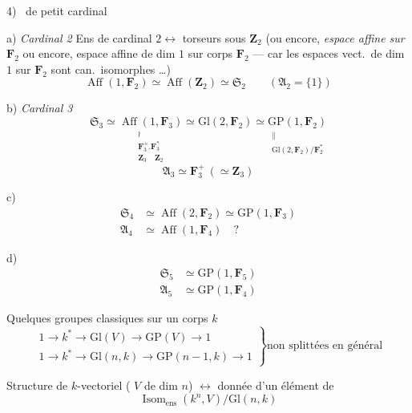 \documentclass[11pt,a4paper]{article}
\begin{document}
4) \ de petit cardinal

a) \emph{Cardinal 2} \quad Ens de cardinal $2 \longleftrightarrow$ torseurs
sous $\mathbf{Z}_2$ (ou encore, \emph{espace affine sur $\mathbf{F}_2$}
\struck{\ill{}} ou encore, espace affine de dim $1$ sur corps $\mathbf{F}_2$ ---
car les espaces vect.\ de dim $1$ sur $\mathbf{F}_2$ sont can.\ isomorphes
…)
\[
  \boxed{\operatorname{Aff}(1, \mathbf{F}_2) \simeq \operatorname{Aff}(\mathbf{Z}_2)
  \simeq \mathfrak{S}_2}
  \qquad (\mathfrak{A}_2 = \{1\})
\]

b) \emph{Cardinal 3}
\[
  \mathfrak{S}_3 \simeq
  \underset{\substack{\wr \\ \mathbf{F}_3^{+}.\mathbf{F}_3^{*} \\
  \mathbf{Z}_3 \quad \mathbf{Z}_2}}{\operatorname{Aff}(1, \mathbf{F}_3)}
  \simeq \mathrm{Gl}(2, \mathbf{F}_2) \simeq
  \underset{\substack{\| \\ \mathrm{Gl}(2, \mathbf{F}_2)/\mathbf{F}_2^{*}}}{\mathrm{GP}(1, \mathbf{F}_2)}
\]
\[
  \mathfrak{A}_3 \simeq \mathbf{F}_3^{+} \ (\simeq \mathbf{Z}_3)
\]

c)
\begin{align*}
  \mathfrak{S}_4 &\simeq \operatorname{Aff}(2, \mathbf{F}_2) \simeq \mathrm{GP}(1, \mathbf{F}_3) \\
  \mathfrak{A}_4 &\simeq \operatorname{Aff}(1, \mathbf{F}_4) \quad ?
\end{align*}

d)
\begin{align*}
  \mathfrak{S}_5 &\simeq \mathrm{GP}(1, \mathbf{F}_5) \\
  \mathfrak{A}_5 &\simeq \mathrm{GP}(1, \mathbf{F}_4)
\end{align*}

Quelques groupes classiques sur un corps $k$
\[
  \left.
  \begin{array}{l}
    1 \to k^{*} \to \mathrm{Gl}(V) \to \mathrm{GP}(V) \to 1 \\
    1 \to k^{*} \to \mathrm{Gl}(n, k) \to \mathrm{GP}(n-1, k) \to 1
  \end{array}
  \right\} \text{non splittées en général}
\]


Structure de $k$-vectoriel ( $V$ de dim $n$)
$\longleftrightarrow$ donnée d'un élément de
\[
  \operatorname{Isom}_{\text{ens}}(k^n, V)/\mathrm{Gl}(n, k)
\]
\end{document}

